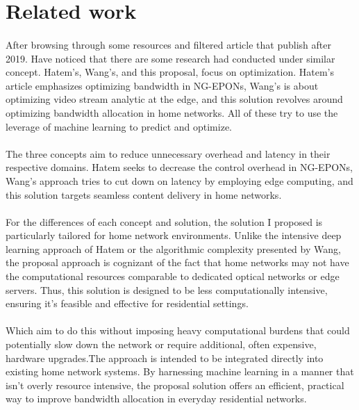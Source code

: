 \documentclass[10pt]{article}
\begin{document}
\section{Related work}
\paragraph{}   
After browsing through some resources and filtered article that publish after 2019. Have
noticed that there are some research had conducted under similar concept. Hatem’s\cite{hatem2019}, Wang’s\cite{wang2020}, and this proposal, focus on optimization. Hatem’s article emphasizes optimizing bandwidth in NG-EPONs, Wang’s is about optimizing video stream analytic at the edge, and this solution revolves around optimizing bandwidth allocation in home networks. All of these try to use the leverage of machine learning to predict and optimize.

\paragraph{}
The three concepts aim to reduce unnecessary overhead and latency in their respective domains. Hatem seeks to decrease the control overhead in NG-EPONs, Wang’s approach tries to cut down on latency by employing edge computing, and this solution targets seamless
content delivery in home networks.

\paragraph{}
For the differences of each concept and solution, the solution I proposed is particularly tailored for home network environments. Unlike the intensive deep learning approach of Hatem or the algorithmic complexity presented by Wang, the proposal approach is cognizant of the fact that home networks may not have the computational resources comparable to dedicated optical networks or edge servers. Thus, this solution is designed to be less computationally intensive, ensuring it’s feasible and effective for residential settings.

\paragraph{}
Which aim to do this without imposing heavy computational burdens that could potentially slow down the network or require additional, often expensive, hardware upgrades.The approach is intended to be integrated directly into existing home network systems. By harnessing machine learning in a manner that isn’t overly resource intensive, the proposal solution offers an efficient, practical way to improve bandwidth allocation in everyday residential networks.
\end{document}

